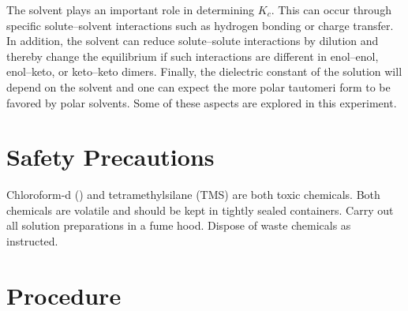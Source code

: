 \documentclass[nobib,nofonts,nols,nohyper]{tufte-handout}
\begin{document}
The solvent plays an important role in determining \( K_c \). 
This can occur through specific solute--solvent interactions such as hydrogen bonding or charge transfer. 
In addition, the solvent can reduce solute--solute interactions by dilution and thereby change the equilibrium if such interactions are different in enol--enol, enol--keto, or keto--keto dimers. 
Finally, the dielectric constant of the solution will depend on the solvent and one can expect the more polar tautomeri form to be favored by polar solvents. 
Some of these aspects are explored in this experiment. 



\pagebreak

\section{Safety Precautions} %
\label{sec:safety}

Chloroform-d () and tetramethylsilane (TMS) are both toxic chemicals. 
Both chemicals are volatile and should be kept in tightly sealed containers. 
Carry out all solution preparations in a fume hood. 
Dispose of waste chemicals as instructed. 


\section{Procedure} %
\label{sec:procedure}
\end{document}

